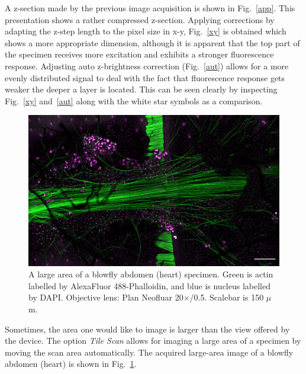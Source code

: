A z-section made by the previous image acquisition is shown in Fig.~\ref{app}. 
This presentation shows a rather compressed z-section. 
Applying corrections by adapting the z-step length to the pixel size in x-y, Fig.~\ref{xy} is obtained which shows a more appropriate dimension, although it is apparent that the top part of the specimen receives more excitation and exhibits a stronger fluorescence response. 
Adjusting auto z-brightness correction (Fig.~\ref{aut}) allows for a more evenly distributed signal to deal with the fact that fluorescence response gets weaker the deeper a layer is located. 
This can be seen clearly by inspecting Fig.~\ref{xy} and~\ref{aut} along with the white star symbols as a comparison.

\begin{figure}[h!]
\centering
\includegraphics[width=0.7\columnwidth]{Exp_3_LSM/Figures/MS3/F5mg_150um}	
\caption{ A large area of a blowfly abdomen (heart) specimen. 
Green is actin labelled by AlexaFluor 488-Phalloidin, and blue is nucleus labelled by DAPI. 
Objective lens: Plan Neofluar 20$\times$/0.5. 
Scalebar is 150 $\mu$m.}
\label{fig:bloabdo}
\end{figure}

Sometimes, the area one would like to image is larger than the view offered by the device. 
The option \textit{Tile Scan} allows for imaging a large area of a specimen by moving the scan area automatically. 
The acquired large-area image of a blowfly abdomen (heart) is shown in Fig.~\ref{fig:bloabdo}.

